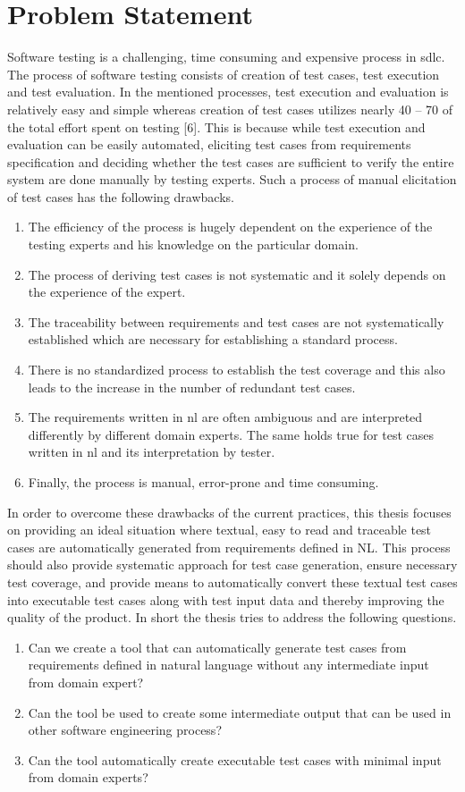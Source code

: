\section{Problem Statement}
Software testing is a challenging, time consuming and expensive process in \gls{sdlc}. The process of software testing consists of creation of test cases, test execution and test evaluation. In the mentioned processes, test execution and evaluation is relatively easy and simple whereas creation of test cases utilizes nearly 40 – 70 of the total effort spent on testing [6]. This is because while test execution and evaluation can be easily automated, eliciting test cases from requirements specification and deciding whether the test cases are sufficient to verify the entire system are done manually by testing experts. Such a process of manual elicitation of test cases has the following drawbacks.
\begin{enumerate}
\item The efficiency of the process is hugely dependent on the experience of the testing experts and his knowledge on the particular domain.
\item The process of deriving test cases is not systematic and it solely depends on the experience of the expert.
\item The traceability between requirements and test cases are not systematically established which are necessary for establishing a standard process.
\item There is no standardized process to establish the test coverage and this also leads to the increase in the number of redundant test cases.
\item The requirements written in \gls{nl} are often ambiguous and are interpreted differently by different domain experts. The same holds true for test cases written in \gls{nl} and its interpretation by tester.
\item Finally, the process is manual, error-prone and time consuming.
\end{enumerate}
In order to overcome these drawbacks of the current practices, this thesis focuses on providing an ideal situation where textual, easy to read and traceable test cases are automatically generated from requirements defined in NL. This process should also provide systematic approach for test case generation, ensure necessary test coverage, and provide means to automatically convert these textual test cases into executable test cases along with test input data and thereby improving the quality of the product. In short the thesis tries to address the following questions.
\begin{enumerate}
\item Can we create a tool that can automatically generate test cases from requirements defined in natural language without any intermediate input from domain expert?
\item Can the tool be used to create some intermediate output that can be used in other software engineering process?
\item Can the tool automatically create executable test cases with minimal input from domain experts?
\end{enumerate}
